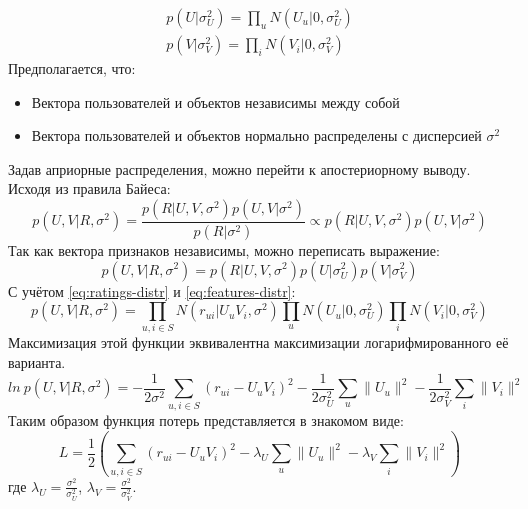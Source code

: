 \begin{equation}\label{eq:features-distr}
\begin{aligned}
        p(U|\sigma_{U}^2) = \prod_{u}{N(U_{u}|0, \sigma_{U}^2)} \\
        p(V|\sigma_{V}^2) = \prod_{i}{N(V_{i}|0, \sigma_{V}^2)}
\end{aligned}
\end{equation}
Предполагается, что:
\begin{itemize}
\item Вектора пользователей и объектов независимы между собой
\item Вектора пользователей и объектов нормально распределены с дисперсией $\sigma^2$
\end{itemize}
Задав априорные распределения, можно перейти к апостериорному выводу.
Исходя из правила Байеса:
\begin{equation}\label{eq:21}
        p(U,V|R, \sigma^2) = \frac{p(R|U, V, \sigma^2)p(U,V|\sigma^2)}{p(R|\sigma^2)} \propto p(R|U, V, \sigma^2)p(U,V|\sigma^2)
\end{equation}
Так как вектора признаков независимы, можно переписать выражение:
\begin{equation}\label{eq:aposteriori-probs}
        p(U,V|R, \sigma^2) = p(R|U, V, \sigma^2)p(U|\sigma_{U}^2)p(V|\sigma_{V}^2)
\end{equation}
С учётом \eqref{eq:ratings-distr} и \eqref{eq:features-distr}:
\begin{equation}\label{eq:aposteriori-inferred}
        p(U,V|R, \sigma^2) = \prod_{u, i \in S}{N(r_{ui}|U_{u}V_{i}, \sigma^2)} \prod_{u}{N(U_{u}|0, \sigma_{U}^2)} \prod_{i}{N(V_{i}|0, \sigma_{V}^2)}
\end{equation}
Максимизация этой функции эквивалентна максимизации логарифмированного её варианта.
\begin{equation}\label{eq:aposteriori-inferred}
        ln~p(U,V|R, \sigma^2) = - \frac{1}{2\sigma^2}\sum_{u, i \in S}{(r_{ui} - U_{u}V_{i})^2} - \frac{1}{2\sigma_{U}^2}\sum_{u}{\|U_{u}\|^2} - \frac{1}{2\sigma_{V}^2}\sum_{i}{\|V_{i}\|^2}
\end{equation}
Таким образом функция потерь представляется в знакомом виде:
\begin{equation}\label{eq:aposteriori-inferred}
        L = \frac{1}{2}(\sum_{u, i \in S}{(r_{ui} - U_{u}V_{i})^2} - \lambda_{U}\sum_{u}{\|U_{u}\|^2} - \lambda_{V}\sum_{i}{\|V_{i}\|^2})
\end{equation}
где $\lambda_{U} = \frac{\sigma^2}{\sigma_{U}^2}$,
$\lambda_{V} = \frac{\sigma^2}{\sigma_{V}^2}$.

